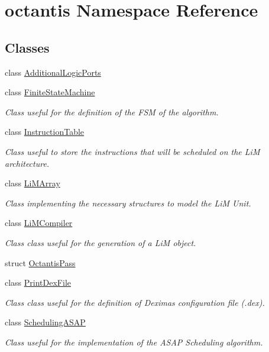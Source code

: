 \hypertarget{namespaceoctantis}{}\section{octantis Namespace Reference}
\label{namespaceoctantis}
\subsection*{Classes}
\begin{DoxyCompactItemize}
\item 
class \hyperlink{classoctantis_1_1AdditionalLogicPorts}{Additional\+Logic\+Ports}
\item 
class \hyperlink{classoctantis_1_1FiniteStateMachine}{Finite\+State\+Machine}
\begin{DoxyCompactList}\small\item\em Class useful for the definition of the F\+SM of the algorithm. \end{DoxyCompactList}\item 
class \hyperlink{classoctantis_1_1InstructionTable}{Instruction\+Table}
\begin{DoxyCompactList}\small\item\em Class useful to store the instructions that will be scheduled on the LiM architecture. \end{DoxyCompactList}\item 
class \hyperlink{classoctantis_1_1LiMArray}{Li\+M\+Array}
\begin{DoxyCompactList}\small\item\em Class implementing the necessary structures to model the LiM Unit. \end{DoxyCompactList}\item 
class \hyperlink{classoctantis_1_1LiMCompiler}{Li\+M\+Compiler}
\begin{DoxyCompactList}\small\item\em Class class useful for the generation of a LiM object. \end{DoxyCompactList}\item 
struct \hyperlink{structoctantis_1_1OctantisPass}{Octantis\+Pass}
\item 
class \hyperlink{classoctantis_1_1PrintDexFile}{Print\+Dex\+File}
\begin{DoxyCompactList}\small\item\em Class class useful for the definition of Dexima\textquotesingle{}s configuration file (.dex). \end{DoxyCompactList}\item 
class \hyperlink{classoctantis_1_1SchedulingASAP}{Scheduling\+A\+S\+AP}
\begin{DoxyCompactList}\small\item\em Class useful for the implementation of the A\+S\+AP Scheduling algorithm. \end{DoxyCompactList}\end{DoxyCompactItemize}
